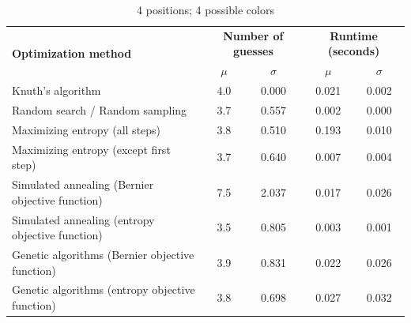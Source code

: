 \documentclass[11pt]{article}
\begin{document}
\begin{table}[h!]
\begin{center}
\begin{tabular}{l c c c c}
\toprule
\multirow{2}{*}{\bfseries Optimization method} 		& \multicolumn{2}{c}{\bfseries Number of guesses} 		& \multicolumn{2}{c}{\bfseries Runtime (seconds)}	\\
\cmidrule(lr){2-3}  \cmidrule(lr){4-5}				& $\mu$ & $\sigma$								& $\mu$ & $\sigma$							\\
\cmidrule(lr){1-5}
Knuth's algorithm							& 4.0 & 0.000									& 0.021 & 0.002							\\
Random search / Random sampling				& 3.7 & 0.557									& 0.002 & 0.000							\\
Maximizing entropy (all steps)					& 3.8 & 0.510									& 0.193 & 0.010							\\
Maximizing entropy (except first step)			& 3.7 & 0.640									& 0.007 & 0.004							\\
Simulated annealing (Bernier objective function)	& 7.5 & 2.037									& 0.017 & 0.026							\\
Simulated annealing (entropy objective function)	& 3.5 & 0.805									& 0.003 & 0.001							\\
Genetic algorithms (Bernier objective function)		& 3.9 & 0.831									& 0.022 &	0.026							\\
Genetic algorithms (entropy objective function)		& 3.8 & 0.698									& 0.027 & 0.032							\\
\bottomrule
\end{tabular}
\end{center}
\caption{4 positions; 4 possible colors}
\label{fig:compare_4_4}
\end{table}
\end{document}
